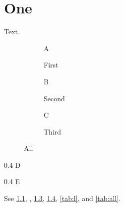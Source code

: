 \documentclass{report}
\begin{document}
\chapter{One}
Text.
\begin{figure}
\begin{subfigure}{0.3\textwidth}
A
\caption{First}
\label{fig:a}
\end{subfigure}
\begin{subfigure}{0.3\textwidth}
B
\caption{Second}
\label{fig:b}
\end{subfigure}
\begin{subfigure}{0.3\textwidth}
C
\caption{Third}
\label{fig:c}
\end{subfigure}
\caption{All}
\label{fig:all}
\end{figure}
\begin{table}
\caption{Tables}
\label{tab:all}
\begin{subtable}{0.4\textwidth}
D
\caption{Left}
\label{tab:l}
\end{subtable}
\begin{subtable}{0.4\textwidth}
E
\caption{Right}
\label{tab:r}
\end{subtable}
\end{table}
See \cref{fig:a}, , \cref{fig:c}, \cref{fig:all}, \cref{tab:l},  and \cref{tab:all}.
\end{document}
